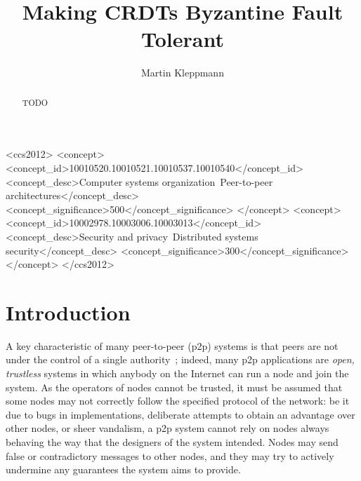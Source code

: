 \documentclass[sigplan,review]{acmart}
\begin{document}
\title{Making CRDTs Byzantine Fault Tolerant}
\author{Martin Kleppmann}

\begin{abstract}
TODO
\end{abstract}

\begin{CCSXML}
<ccs2012>
    <concept>
        <concept_id>10010520.10010521.10010537.10010540</concept_id>
        <concept_desc>Computer systems organization~Peer-to-peer architectures</concept_desc>
        <concept_significance>500</concept_significance>
    </concept>
    <concept>
        <concept_id>10002978.10003006.10003013</concept_id>
        <concept_desc>Security and privacy~Distributed systems security</concept_desc>
        <concept_significance>300</concept_significance>
    </concept>
</ccs2012>
\end{CCSXML}


\maketitle

\section{Introduction}

A key characteristic of many peer-to-peer (p2p) systems is that peers are not under the control of a single authority~\cite{Buford:2010}; indeed, many p2p applications are \emph{open, trustless} systems in which anybody on the Internet can run a node and join the system.
As the operators of nodes cannot be trusted, it must be assumed that some nodes may not correctly follow the specified protocol of the network: be it due to bugs in implementations, deliberate attempts to obtain an advantage over other nodes, or sheer vandalism, a p2p system cannot rely on nodes always behaving the way that the designers of the system intended.
Nodes may send false or contradictory messages to other nodes, and they may try to actively undermine any guarantees the system aims to provide.
\end{document}
